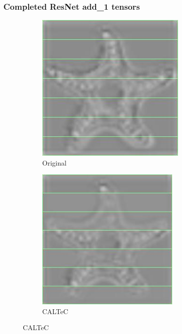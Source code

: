 \documentclass[aspectratio=169]{beamer}
\begin{document}
\begin{frame}
	\frametitle{Completed ResNet add\_1 tensors}
	\begin{figure}[H]
		\centering
		\begin{subfigure}{.17\linewidth}
			\centering
			\includegraphics[width = 0.778\linewidth]{originalchannel1scaled.jpg}
			\caption{Original}
		\end{subfigure}%
		\hfill
		\begin{subfigure}{.17\textwidth}
			\centering
			\includegraphics[width = 0.778\textwidth]{caltecrepairedchannel1scaled.jpg}
			\caption{CALTeC}
		\end{subfigure}%

\end{figure}
\end{frame}
\end{document}
